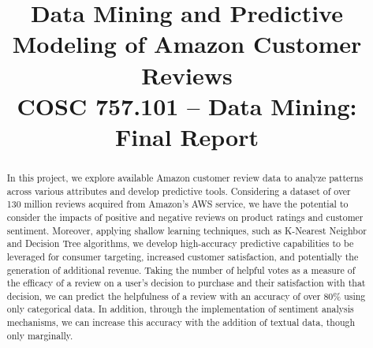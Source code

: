 \documentclass[10pt, conference, compsocconf]{IEEEtran}
\begin{document}
\title{Data Mining and Predictive Modeling of Amazon Customer Reviews \\ {\large COSC 757.101 – Data Mining:  Final Report}}

\newcommand{\superast}{\raisebox{9pt}{$\ast$}}
\newcommand{\superdagger}{\raisebox{9pt}{$\dagger$}}
\newcommand{\superddagger}{\raisebox{9pt}{$\ddagger$}}
\newcommand{\superS}{\raisebox{9pt}{$\S$}}
\newcommand{\superP}{\raisebox{9pt}{$\P$}}

\author{
}

\maketitle

\begin{abstract}

In this project, we explore available Amazon customer review data to analyze patterns across various attributes and develop predictive tools. Considering a dataset of over 130 million reviews acquired from Amazon's AWS service, we have the potential to consider the impacts of positive and negative reviews on product ratings and customer sentiment. Moreover, applying shallow learning techniques, such as K-Nearest Neighbor and Decision Tree algorithms, we develop high-accuracy predictive capabilities to be leveraged for consumer targeting, increased customer satisfaction, and potentially the generation of additional revenue. Taking the number of helpful votes as a measure of the efficacy of a review on a user's decision to purchase and their satisfaction with that decision, we can predict the helpfulness of a review with an accuracy of over 80\% using only categorical data. In addition, through the implementation of sentiment analysis mechanisms, we can increase this accuracy with the addition of textual data, though only marginally.
\end{abstract}
\end{document}

